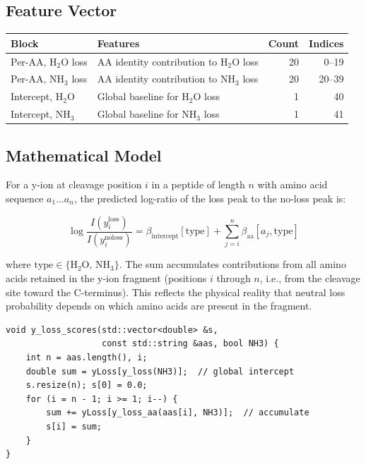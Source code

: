 \documentclass[11pt,a4paper]{article}
\begin{document}
\subsection{Feature Vector}

\begin{center}
\begin{tabular}{llrr}
\toprule
\textbf{Block} & \textbf{Features} & \textbf{Count} & \textbf{Indices} \\
\midrule
Per-AA, H$_2$O loss & AA identity contribution to H$_2$O loss & 20 & 0--19 \\
Per-AA, NH$_3$ loss & AA identity contribution to NH$_3$ loss & 20 & 20--39 \\
Intercept, H$_2$O & Global baseline for H$_2$O loss & 1 & 40 \\
Intercept, NH$_3$ & Global baseline for NH$_3$ loss & 1 & 41 \\
\bottomrule
\end{tabular}
\end{center}

\subsection{Mathematical Model}

For a y-ion at cleavage position $i$ in a peptide of length $n$ with amino acid sequence $a_1 \ldots a_n$, the predicted log-ratio of the loss peak to the no-loss peak is:

\begin{equation}
\log\!\frac{I(y_i^{\text{loss}})}{I(y_i^{\text{noloss}})} = \beta_{\text{intercept}}[\text{type}] + \sum_{j=i}^{n} \beta_{\text{aa}}[a_j, \text{type}]
\label{eq:yloss}
\end{equation}

where $\text{type} \in \{\text{H}_2\text{O},\, \text{NH}_3\}$. The sum accumulates contributions from all amino acids retained in the y-ion fragment (positions $i$ through $n$, i.e., from the cleavage site toward the C-terminus). This reflects the physical reality that neutral loss probability depends on which amino acids are present in the fragment.

\begin{lstlisting}[caption={Neutral loss prediction (lines 1478--1486)}]
void y_loss_scores(std::vector<double> &s,
                   const std::string &aas, bool NH3) {
    int n = aas.length(), i;
    double sum = yLoss[y_loss(NH3)];  // global intercept
    s.resize(n); s[0] = 0.0;
    for (i = n - 1; i >= 1; i--) {
        sum += yLoss[y_loss_aa(aas[i], NH3)];  // accumulate
        s[i] = sum;
    }
}
\end{lstlisting}
\end{document}
